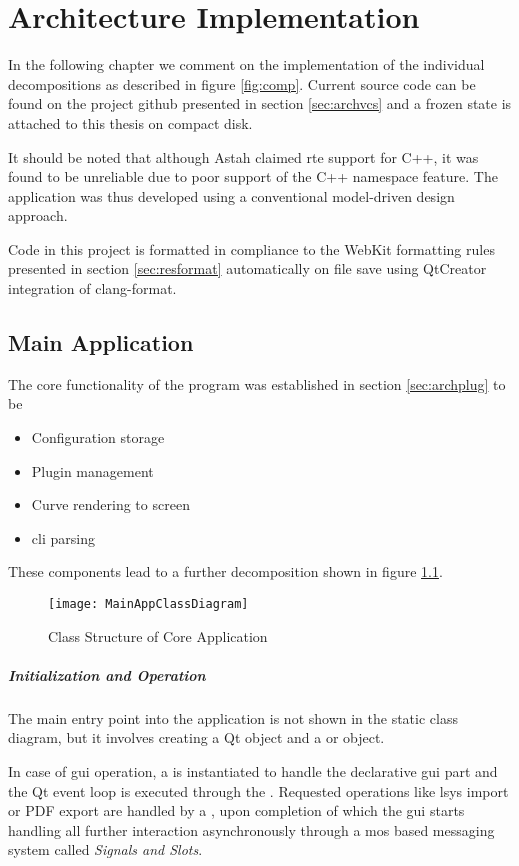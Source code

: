 \chapter{Architecture Implementation}
In the following chapter we comment on the implementation of the individual decompositions as described in figure \ref{fig:comp}.
Current source code can be found on the project \gls{github} presented in section \ref{sec:archvcs} and a frozen state is attached to this thesis on compact disk.

It should be noted that although Astah claimed \gls{rte} support for C++, it was found to be unreliable due to poor support of the C++ namespace feature.
The application was thus developed using a conventional model-driven design approach.

Code in this project is formatted in compliance to the WebKit formatting rules presented in section \ref{sec:resformat} automatically on file save using QtCreator integration of clang-format. 

\section{Main Application}
The core functionality of the program was established in section \ref{sec:archplug} to be
\begin{itemize}
	\item Configuration storage
	\item Plugin management
	\item Curve rendering to screen
	\item \gls{cli} parsing
\end{itemize}

These components lead to a further decomposition shown in figure \ref{fig:main}.

\begin{figure}[htb]
	\texttt{[image: MainAppClassDiagram]}
	\caption{Class Structure of Core Application}
	\label{fig:main}
\end{figure} 

\paragraph{Initialization and Operation}
The main entry point into the application is not shown in the static class diagram, but it involves creating a Qt  object and a  or  object.

In case of \gls{gui} operation, a  is instantiated to handle the declarative \gls{gui} part and the Qt event loop is executed through the . Requested operations like \gls{lsys} import or PDF export are handled by a , upon completion of which the \gls{gui} starts handling all further interaction asynchronously through a \gls{mos} based messaging system called \textit{Signals and Slots}.


